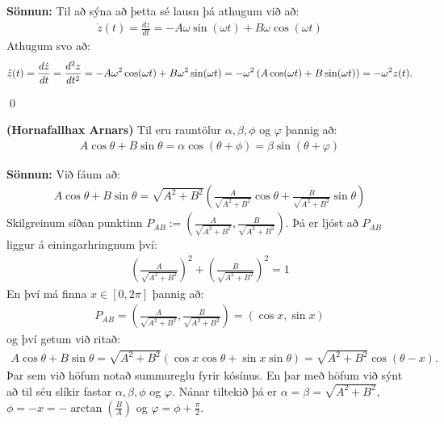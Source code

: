 \textbf{Sönnun:} Til að sýna að þetta sé lausn þá athugum við að:
\begin{align*}
    \dot{z}(t) = \frac{dz}{dt} = -A\omega \sin(\omega t) + B\omega \cos(\omega t)
\end{align*}
Athugum svo að:
\begin{align*}
    \Ddot{z}(t) = \frac{d\dot{z}}{dt} =  \frac{d^2z}{dt^2} = -A\omega^2 \cos(\omega t) + B\omega^2 \sin(\omega t) = -\omega^2 \left( A\cos(\omega t) + B\sin(\omega t) \right) = -\omega^2 z(t).
\end{align*}

\qed

\begin{tcolorbox}
\begin{setning} \label{regla:hornafallahaxArnars}
\textbf{(Hornafallhax Arnars)} Til eru rauntölur $\alpha, \beta, \phi$ og $\varphi$ þannig að:
\begin{align*}
    A\cos\theta + B\sin\theta = \alpha\cos(\theta + \phi) = \beta \sin(\theta + \varphi)
\end{align*}
\end{setning}
\end{tcolorbox}

\textbf{Sönnun:} Við fáum að:
\begin{align*}
    A\cos\theta + B\sin\theta = \sqrt{A^2 + B^2}\left( \frac{A}{\sqrt{A^2+B^2}}\cos\theta + \frac{B}{\sqrt{A^2 +B^2}}\sin\theta \right)
\end{align*}
Skilgreinum síðan punktinn $P_{AB} := \left( \frac{A}{\sqrt{A^2+B^2}}, \frac{B}{\sqrt{A^2+B^2}} \right)$. Þá er ljóst að $P_{AB}$ liggur á einingarhringnum því:
\begin{align*}
    \left(\frac{A}{\sqrt{A^2+B^2}}\right)^2 + \left( \frac{B}{\sqrt{A^2+B^2}} \right)^2 = 1
\end{align*}
En því má finna $x \in [0,2\pi]$ þannig að:
\begin{align*}
    P_{AB} = \left( \frac{A}{\sqrt{A^2+B^2}}, \frac{B}{\sqrt{A^2+B^2}} \right) = \left( \cos x, \sin x \right)
\end{align*}
og því getum við ritað:
\begin{align*}
    A\cos\theta + B\sin\theta = \sqrt{A^2+B^2}\left( \cos x \cos\theta + \sin x \sin\theta \right) = \sqrt{A^2+B^2} \cos(\theta - x).
\end{align*}
Þar sem við höfum notað summureglu fyrir kósínus. En þar með höfum við sýnt að til séu slíkir fastar $\alpha, \beta, \phi$ og $\varphi$. Nánar tiltekið þá er $\alpha = \beta = \sqrt{A^2+B^2}$, $\phi = -x = -\arctan(\frac{B}{A})$ og $\varphi = \phi + \frac{\pi}{2}$.

